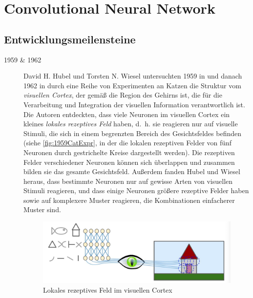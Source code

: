 \section{Convolutional Neural Network} \label{sec:cnn}

\subsection{Entwicklungsmeilensteine} \label{subsec:milestonecnn}

\begin{description}
	\item[1959 \& 1962]
		
	David H. Hubel und Torsten N. Wiesel untersuchten 1959 in \cite{PMID:14403678,PMID:14403679} und danach 1962 in \cite{PMID:14449617} durch eine Reihe von Experimenten an Katzen die Struktur vom \emph{visuellen Cortex}, der gemäß \cite{Bergua2017} die Region des Gehirns ist, die für die Verarbeitung und Integration der visuellen Information verantwortlich ist. Die Autoren entdeckten, dass viele Neuronen im visuellen Cortex ein kleines \emph{lokales rezeptives Feld} haben, d.~h. sie reagieren nur auf visuelle Stimuli, die sich in einem begrenzten Bereich des Gesichtsfeldes befinden (siehe \autoref{fig:1959CatExpr}, in der die lokalen rezeptiven Felder von fünf Neuronen durch gestrichelte Kreise dargestellt werden). Die rezeptiven Felder verschiedener Neuronen können sich überlappen und zusammen bilden sie das gesamte Gesichtsfeld. Außerdem fanden Hubel und Wiesel heraus, dass bestimmte Neuronen nur auf gewisse Arten von visuellen Stimuli reagieren, und dass einige Neuronen größere rezeptive Felder haben sowie auf komplexere Muster reagieren, die Kombinationen einfacherer Muster sind.
	
	\begin{figure}[!ht]
		\centering
		\includegraphics[width=\linewidth]{images/local_receptive_field}
		\caption{Lokales rezeptives Feld im visuellen Cortex \protect\cite{LocalReceptiveField}}
		\label{fig:1959CatExpr}
	\end{figure}
	

\end{description}
